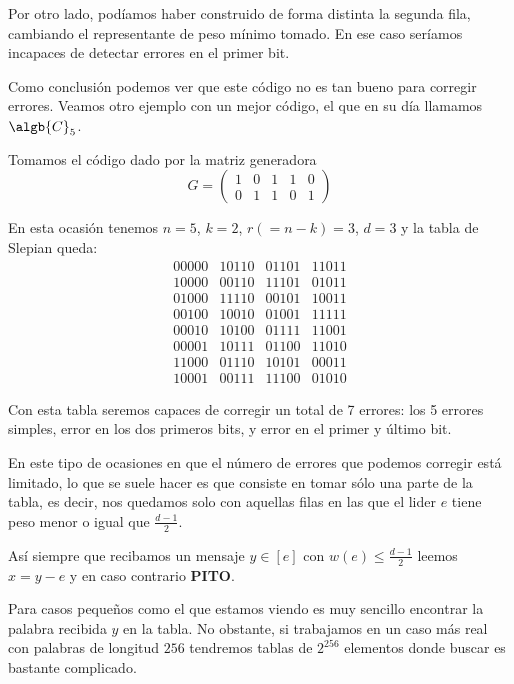 Por otro lado, podíamos haber construido de forma distinta la segunda fila, cambiando el representante de peso mínimo tomado. En ese caso seríamos incapaces de detectar errores en el primer bit.

Como conclusión podemos ver que este código no es tan bueno para corregir errores. Veamos otro ejemplo con un mejor código, el que en su día llamamos $\algb{C}_5$.

\begin{example}
Tomamos el código dado por la matriz generadora
\[G = \left(\begin{array}{ccccc} 1 & 0 & 1 & 1 & 0 \\ 0 & 1 & 1 & 0 & 1 \end{array}\right) \]

En esta ocasión tenemos $n=5$, $k=2$, $r(=n-k)=3$, $d=3$ y la tabla de Slepian queda:
\[\begin{array}{cccc}
00000 & 10110 & 01101 & 11011 \\
10000 & 00110 & 11101 & 01011 \\
01000 & 11110 & 00101 & 10011 \\
00100 & 10010 & 01001 & 11111 \\
00010 & 10100 & 01111 & 11001 \\
00001 & 10111 & 01100 & 11010 \\
11000 & 01110 & 10101 & 00011 \\
10001 & 00111 & 11100 & 01010
\end{array}\]

Con esta tabla seremos capaces de corregir un total de 7 errores: los 5 errores simples, error en los dos primeros bits, y error en el primer y último bit.

\end{example}

En este tipo de ocasiones en que el número de errores que podemos corregir está limitado, lo que se suele hacer es  que consiste en tomar sólo una parte de la tabla, es decir, nos quedamos solo con aquellas filas en las que el lider $e$ tiene peso menor o igual que $\frac{d-1}{2}$.

Así siempre que recibamos un mensaje $y \in [e]$ con $w(e) \leq \frac{d-1}{2}$ leemos $x=y-e$ y en caso contrario \textbf{PITO}.

Para casos pequeños como el que estamos viendo es muy sencillo encontrar la palabra recibida $y$ en la tabla. No obstante, si trabajamos en un caso más real con palabras de longitud $256$ tendremos tablas de $2^{256}$ elementos donde buscar es bastante complicado.

